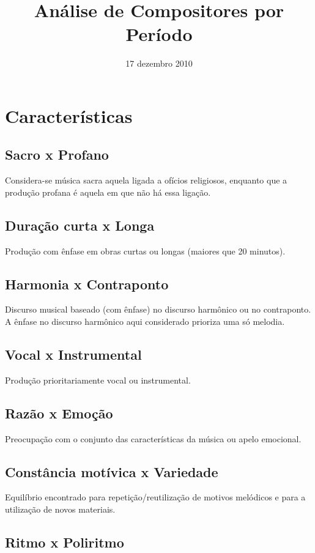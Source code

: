 \documentclass[11pt]{article}
\title{Análise de Compositores por Período}
\author{}
\date{17 dezembro 2010}
\begin{document}
\maketitle


\section{Características}
\label{sec-1}
\subsection{Sacro x Profano}
\label{sec-1_1}

Considera-se música sacra aquela ligada a ofícios religiosos, enquanto que a produção profana é aquela em que não há essa ligação. 
\subsection{Duração curta x Longa}
\label{sec-1_2}

Produção com ênfase em obras curtas ou longas (maiores que 20 minutos).
\subsection{Harmonia x Contraponto}
\label{sec-1_3}

Discurso musical baseado (com ênfase) no discurso harmônico ou
no contraponto. A ênfase no discurso harmônico aqui
considerado prioriza uma só melodia.
\subsection{Vocal x Instrumental}
\label{sec-1_4}

Produção prioritariamente vocal ou instrumental.
\subsection{Razão x Emoção}
\label{sec-1_5}

Preocupação com o conjunto das características da música ou apelo emocional.
\subsection{Constância motívica x Variedade}
\label{sec-1_6}

Equilíbrio encontrado para repetição/reutilização de motivos melódicos e para
a utilização de novos materiais.
\subsection{Ritmo x Poliritmo}
\label{sec-1_7}
\end{document}
